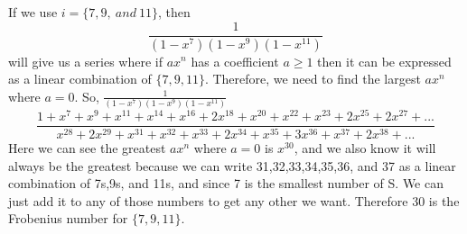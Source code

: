 \documentclass[10pt,a4paper]{report}
\begin{document}
	If we use $i = \{7,9,\ and\ 11\}$, then 
	\[\frac{1}{(1-x^7)(1-x^9)(1-x^{11})}\]
	will give us a series where if $ax^n$ has a coefficient $a\geq1$ then it can be expressed as a linear combination of $\{7,9,11\}$.  Therefore, we need to find the largest $ax^n$ where $a=0$.  So, $\frac{1}{(1-x^7)(1-x^9)(1-x^{11})}$\\
	\[\frac{1 + x^7 + x^9 + x^{11} + x^{14} + x^{16} + 2x^{18} + x^{20} + x^{22} + x^{23} + 2x^{25} + 2x^{27} + ...}{x^{28} + 2x^{29} + x^{31} + x^{32} + x^{33} + 2x^{34} + x^{35} + 3x^{36} + x^{37} + 2x^{38} + ...}\]
	Here we can see the greatest $ax^n$ where $a=0$ is $x^{30}$, and we also know it will always be the greatest because we can write 31,32,33,34,35,36, and 37 as a linear combination of 7s,9s, and 11s, and since 7 is the smallest number of S.  We can just add it to any of those numbers to get any other we want.  Therefore 30 is the Frobenius number for $\{7,9,11\}$.\\
	\newline
\end{document}
